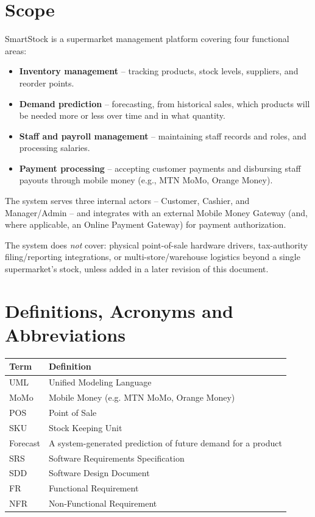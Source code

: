 \documentclass[11pt,a4paper]{report}
\begin{document}
\section{Scope}
SmartStock is a supermarket management platform covering four functional areas:
\begin{itemize}[itemsep=2pt]
    \item \textbf{Inventory management} -- tracking products, stock levels, suppliers, and reorder points.
    \item \textbf{Demand prediction} -- forecasting, from historical sales, which products will be needed more or less over time and in what quantity.
    \item \textbf{Staff and payroll management} -- maintaining staff records and roles, and processing salaries.
    \item \textbf{Payment processing} -- accepting customer payments and disbursing staff payouts through mobile money (e.g., MTN MoMo, Orange Money).
\end{itemize}
The system serves three internal actors -- Customer, Cashier, and Manager/Admin -- and integrates with an external Mobile Money Gateway (and, where applicable, an Online Payment Gateway) for payment authorization.

The system does \emph{not} cover: physical point-of-sale hardware drivers, tax-authority filing/reporting integrations, or multi-store/warehouse logistics beyond a single supermarket's stock, unless added in a later revision of this document.

\section{Definitions, Acronyms and Abbreviations}
\begin{longtable}{L{3.5cm} L{10.5cm}}
\toprule
\textbf{Term} & \textbf{Definition} \\
\midrule
\endhead
UML & Unified Modeling Language \\
MoMo & Mobile Money (e.g. MTN MoMo, Orange Money) \\
POS & Point of Sale \\
SKU & Stock Keeping Unit \\
Forecast & A system-generated prediction of future demand for a product \\
SRS & Software Requirements Specification \\
SDD & Software Design Document \\
FR & Functional Requirement \\
NFR & Non-Functional Requirement \\
\bottomrule
\end{longtable}
\end{document}
